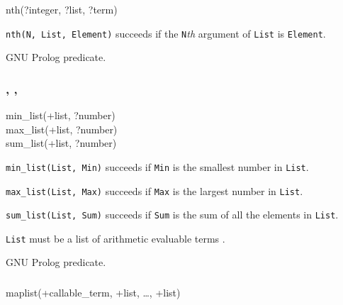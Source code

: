 \begin{TemplatesOneCol}
nth(?integer, ?list, ?term)

\end{TemplatesOneCol}

\Description

\texttt{nth(N, List, Element)} succeeds if the \texttt{N}\emph{th}
argument of \texttt{List} is \texttt{Element}.

\PlErrorsNone

\Portability

GNU Prolog predicate.

\subsubsection{,
               ,
               }

\begin{TemplatesOneCol}
min\_list(+list, ?number)\\
max\_list(+list, ?number)\\
sum\_list(+list, ?number)

\end{TemplatesOneCol}

\Description

\texttt{min\_list(List, Min)} succeeds if \texttt{Min} is the
smallest number in \texttt{List}.

\texttt{max\_list(List, Max)} succeeds if \texttt{Max} is the
largest number in \texttt{List}.

\texttt{sum\_list(List, Sum)} succeeds if \texttt{Sum} is the
sum of all the elements in \texttt{List}.

\texttt{List} must be a list of arithmetic evaluable terms
.

\PlErrorsNone

\Portability

GNU Prolog predicate.

\subsubsection{}

\begin{TemplatesOneCol}
maplist(+callable\_term, +list, \ldots, +list)

\end{TemplatesOneCol}

\Description

